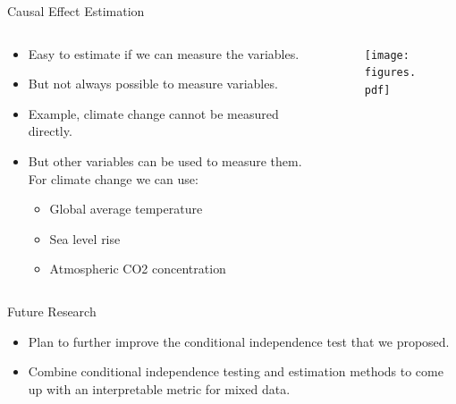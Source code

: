 \documentclass[aspectratio=169]{beamer}
\begin{document}
\begin{frame}{Causal Effect Estimation}
	\begin{columns}
		\begin{column}{0.65 \textwidth}
			\begin{itemize}
				\item Easy to estimate if we can measure the variables.
				\item But not always possible to measure variables.
				\item Example, climate change cannot be measured directly.
				\item But other variables can be used to measure them. For climate change we can use:
					\begin{itemize}
						\item Global average temperature
						\item Sea level rise
						\item Atmospheric CO2 concentration
					\end{itemize}
			\end{itemize}
		\end{column}
		\begin{column}{0.38 \textwidth}	
			\begin{figure}
				\center
				\texttt{[image: figures.pdf]}
			\end{figure}
		\end{column}
	\end{columns}

	\vspace{2em}
	
\end{frame}

\begin{frame}{Future Research}
	\begin{itemize}
		\item Plan to further improve the conditional independence test that we proposed.
		\item Combine conditional independence testing and estimation methods to come up with an interpretable metric for mixed data.
	\end{itemize}
\end{frame}
\end{document}
